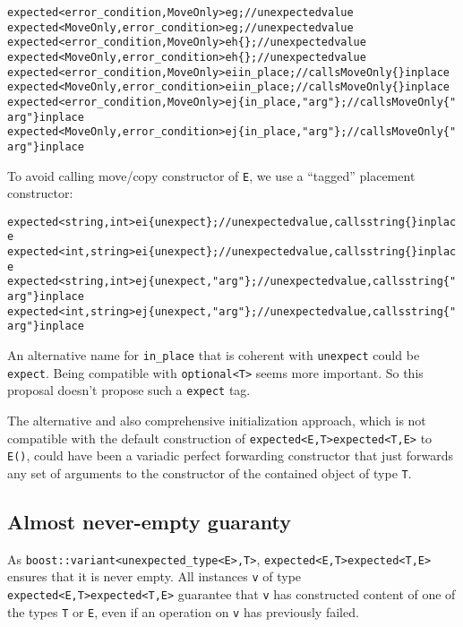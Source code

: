 \documentclass[a4paper,10pt]{article}
\newcommand{\cpp}[1]{\lstinline{#1}}
\newcommand{\suppress}[1]{\colorbox{suppress_color}{#1}}
\newcommand{\update}[1]{\colorbox{update_color}{#1}}
\begin{document}
\begin{alltt}
\suppress{expected<error_condition,MoveOnly> eg;                  // unexpected value}
\update{expected<MoveOnly, error_condition> eg;                  // unexpected value}
\suppress{expected<error_condition,MoveOnly> eh\{\};                // unexpected value}
\update{expected<MoveOnly, error_condition> eh\{\};                // unexpected value}
\suppress{expected<error_condition,MoveOnly> ei{in_place};        // calls MoveOnly\{\} in place}
\update{expected<MoveOnly, error_condition> ei{in_place};        // calls MoveOnly\{\} in place}
\suppress{expected<error_condition,MoveOnly> ej\{in_place, "arg"\}; // calls MoveOnly\{"arg"\} in place}
\update{expected<MoveOnly, error_condition> ej\{in_place, "arg"\}; // calls MoveOnly\{"arg"\} in place}
\end{alltt}

\noindent
To avoid calling move/copy constructor of \cpp{E}, we use a ``tagged'' placement constructor: 

\begin{alltt}
\suppress{expected<string,int> ei\{unexpect\};         // unexpected value, calls string\{\} in place}
\update{expected<int, string> ei\{unexpect\};         // unexpected value, calls string\{\} in place}
\suppress{expected<string,int> ej\{unexpect, "arg"\};  // unexpected value, calls string\{"arg"\} in place}
\update{expected<int, string> ej\{unexpect, "arg"\};  // unexpected value, calls string\{"arg"\} in place}
\end{alltt}

\noindent
An alternative name for \cpp{in_place} that is coherent with \cpp{unexpect} could be \cpp{expect}. Being compatible with \cpp{optional<T>} seems more important. So this proposal doesn't propose such a \cpp{expect} tag.
\newline

The alternative and also comprehensive initialization approach, which is not compatible with the default construction of \suppress{\cpp{expected<E,T>}}\update{\cpp{expected<T,E>}} to \cpp{E()}, could have been a variadic perfect forwarding constructor that just forwards any set of arguments to the constructor of the contained object of type \cpp{T}. 

\subsection{Almost never-empty guaranty}

As \cpp{boost::variant<unexpected_type<E>,T>}, \suppress{\cpp{expected<E,T>}}\update{\cpp{expected<T,E>}} ensures that it is never empty. All instances \cpp{v} of type \suppress{\cpp{expected<E,T>}}\update{\cpp{expected<T,E>}} guarantee that \cpp{v} has constructed content of one of the types \cpp{T} or \cpp{E}, even if an operation on \cpp{v} has previously failed.
\end{document}
